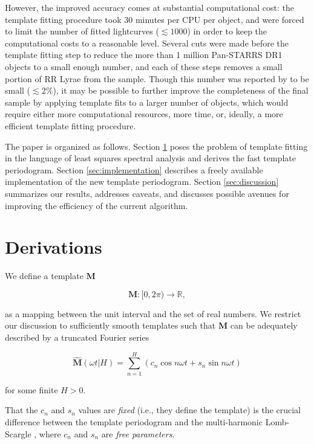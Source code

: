 \documentclass{aastex62}
\begin{document}
However, the improved accuracy comes at substantial computational cost: the template fitting
procedure took 30 minutes per CPU per object, and \cite{Sesar_etal_2016} were forced to limit
the number of fitted lightcurves ($\lesssim 1000$) in order to keep the computational costs
to a reasonable level. Several cuts were made before the template fitting step to reduce the
more than 1 million Pan-STARRS DR1 objects to a small enough number, and each of these steps
removes a small portion of RR Lyrae from the sample. Though this number was reported by
\cite{Sesar_etal_2016} to be small ($\lesssim 2\%$), it may be possible to further improve
the completeness of the final sample by applying template fits to a larger number of objects,
which would require either more computational resources, more time, or, ideally, a more efficient
template fitting procedure.

The paper is organized as follows. Section \ref{sec:derivations} poses the problem of template
fitting in the language of least squares spectral analysis and derives the fast template
periodogram. Section \ref{sec:implementation} describes a freely available implementation
of the new template periodogram. Section \ref{sec:discussion} summarizes our results,
addresses caveats, and discusses possible avenues for improving the efficiency of the current
algorithm.


\section{Derivations}\label{sec:derivations}

We define a template $\mathbf{M}$

\begin{equation}
    \mathbf{M} : [0, 2\pi)\rightarrow\mathbb{R},
\end{equation}

\noindent as a mapping between the unit interval and the set of real numbers. We
restrict our discussion to sufficiently smooth templates such that
$\mathbf{M}$ can be adequately described by a truncated Fourier series

\begin{equation}
    \hat{\mathbf{M}}(\omega t|H) = \sum_{n=1}^H\left(c_n\cos{n\omega t} + s_n\sin{n\omega t}\right)
\end{equation}

\noindent for some finite $H > 0$.

That the $c_n$ and $s_n$ values are \emph{fixed} (i.e., they define
the template) is the crucial difference between the template periodogram and
the multi-harmonic Lomb-Scargle \citep{Palmer_2009,Bretthorst+Chi-Cheng_1988}, where $c_n$ and $s_n$
are \emph{free parameters}.
\end{document}
